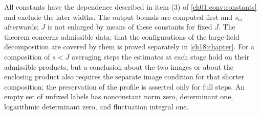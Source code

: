 \begin{theorem}
All constants have the dependence described in item (3) of \cref{ch01:conv:constants} and exclude the later widths. The output bounds are computed first and $s_{\mathrm{er}}$ afterwards; $J$ is not enlarged by means of these constants for fixed $J$. The theorem concerns admissible data; that the configurations of the large-field decomposition are covered by them is proved separately in \cref{ch18:chapter}. For a composition of $s<J$ averaging steps the estimates at each stage hold on their admissible products, but a conclusion about the two images or about the enclosing product also requires the separate image condition for that shorter composition; the preservation of the profile is asserted only for full steps. An empty set of unfixed labels has nonconstant norm zero, determinant one, logarithmic determinant zero, and fluctuation integral one.
\end{theorem}

